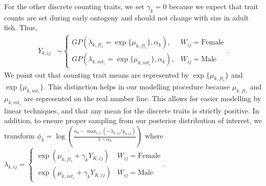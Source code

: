\documentclass[
  12pt,
]{article}
\begin{document}
For the other discrete counting traits, we set \(\gamma_k = 0\) because
we expect that trait counts are set during early ontogeny and should not
change with size in adult fish. Thus, \begin{align}
{Y}_{k,ij} & \sim \left\{\begin{array}{ll} GP(\lambda_{k,ft_i} = \exp\{\mu_{k,ft_i}\},\alpha_k), & W_{ij} = \text{Female} \\ GP(\lambda_{k,mt_i} = \exp\{\mu_{k,mt_i}\},\alpha_k), & W_{ij} = \text{Male} \end{array}\right..
\label{eq:disc_ind}
\end{align} We point out that counting trait means are represented by
\(\exp\{\mu_{k,ft_i}\}\) and \(\exp\{\mu_{k,mt_i}\}\). This distinction
helps in our modelling procedure because \(\mu_{k,ft_i}\) and
\(\mu_{k,mt_i}\) are represented on the real number line. This allows
for easier modelling by linear techniques, and that any mean for the
discrete traits is strictly positive. In addition, to ensure proper
sampling from our posterior distribution of interest, we transform
\(\phi_k = \log\left(\frac{\alpha_k - \max_{i,j}(-\lambda_{k,ij}/y_{k,ij})}{1 - \alpha_k}\right)\)
where
\(\lambda_{k,ij} = \left\{\begin{array}{cc} \exp(\mu_{k,ft_i} + \gamma_k Y_{K,ij}) & W_{ij} = \text{Female} \\ \exp(\mu_{k,mt_i} + \gamma_k Y_{K,ij}) & W_{ij} = \text{Male} \end{array}\right.\).
\end{document}
